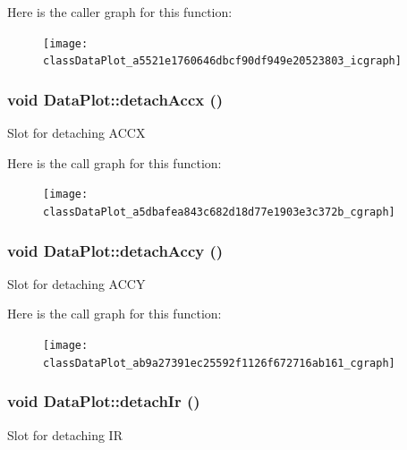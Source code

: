 Here is the caller graph for this function:\nopagebreak
\begin{figure}[H]
\begin{center}
\leavevmode
\texttt{[image: classDataPlot\_a5521e1760646dbcf90df949e20523803\_icgraph]}
\end{center}
\end{figure}


\hypertarget{classDataPlot_a5dbafea843c682d18d77e1903e3c372b}{
\subsubsection[{detachAccx}]{\setlength{\rightskip}{0pt plus 5cm}void DataPlot::detachAccx ()}}
\label{classDataPlot_a5dbafea843c682d18d77e1903e3c372b}
Slot for detaching ACCX 

Here is the call graph for this function:\nopagebreak
\begin{figure}[H]
\begin{center}
\leavevmode
\texttt{[image: classDataPlot\_a5dbafea843c682d18d77e1903e3c372b\_cgraph]}
\end{center}
\end{figure}


\hypertarget{classDataPlot_ab9a27391ec25592f1126f672716ab161}{
\subsubsection[{detachAccy}]{\setlength{\rightskip}{0pt plus 5cm}void DataPlot::detachAccy ()}}
\label{classDataPlot_ab9a27391ec25592f1126f672716ab161}
Slot for detaching ACCY 

Here is the call graph for this function:\nopagebreak
\begin{figure}[H]
\begin{center}
\leavevmode
\texttt{[image: classDataPlot\_ab9a27391ec25592f1126f672716ab161\_cgraph]}
\end{center}
\end{figure}


\hypertarget{classDataPlot_a63ee85d95a1ce9b0ac889ea16c4827c7}{
\subsubsection[{detachIr}]{\setlength{\rightskip}{0pt plus 5cm}void DataPlot::detachIr ()}}
\label{classDataPlot_a63ee85d95a1ce9b0ac889ea16c4827c7}
Slot for detaching IR 

